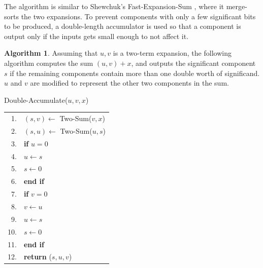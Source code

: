 \documentclass[11pt]{article}
\theoremstyle{definition}
\newtheorem{alg}[thm]{Algorithm}
\begin{document}
The algorithm is similar to Shewchuk's {\sc Fast-Expansion-Sum} 
\cite[p. 320]{she97}, 
where it merge-sorts the two expansions.  To prevent components with
only a few significant bits to be produced, a double-length accumulator
is used so that a component is output only if the inputs gets small 
enough to not affect it.  

\begin{alg}
  \label{double_accum_alg}
  Assuming that $u, v$ is a two-term expansion, the following algorithm
  computes the sum $(u, v) + x$, and outputs the significant component
  $s$ if the remaining components contain more than one double worth
  of significand. $u$ and $v$ are modified to represent the other
  two components in the sum.

  \vspace{0.1in} \hfill
  \begin{minipage}[t]{5in}
    {\sc Double-Accumulate}($u, v, x$) \\
    \begin{tabular}{rl}
      1.  & $(s, v) \leftarrow$ {\sc Two-Sum}($v, x$)  \\
      2.  & $(s, u) \leftarrow$ {\sc Two-Sum}($u, s$)  \\
      3.  & {\bf if} $u = 0$ \\
      4.  & \quad $u \leftarrow s$ \\
      5.  & \quad $s \leftarrow 0$ \\
      6.  & {\bf end if} \\
      7.  & {\bf if} $v = 0$ \\
      8.  & \quad $v \leftarrow u$ \\
      9.  & \quad $u \leftarrow s$ \\
      10. & \quad $s \leftarrow 0$ \\
      11. & {\bf end if}   \\
      12. & {\bf return} ($s, u, v$) \\
    \end{tabular}
  \end{minipage}  
\end{alg}
\end{document}
